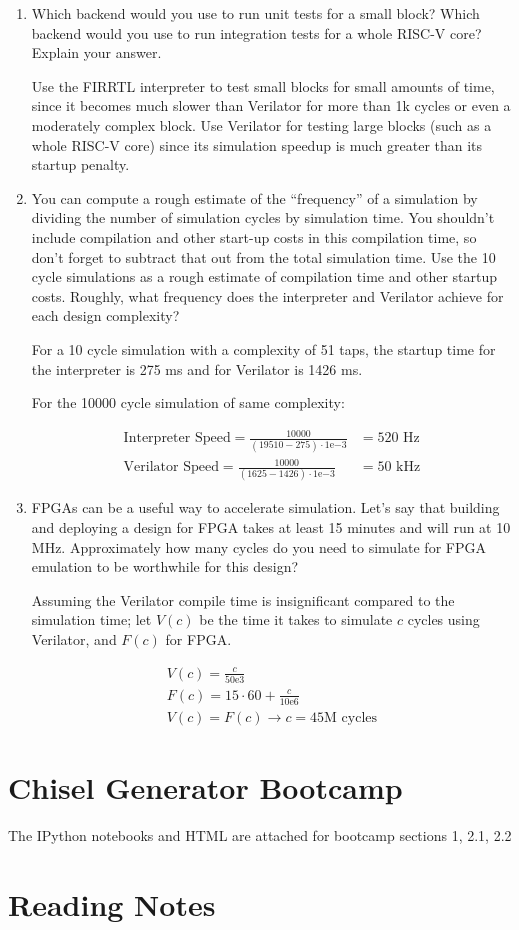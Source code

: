 \begin{enumerate}
\item {\color{blue} Which backend would you use to run unit tests for a small block? Which backend would you use to run integration tests for a whole RISC-V core? Explain your answer.}

Use the FIRRTL interpreter to test small blocks for small amounts of time, since it becomes much slower than Verilator for more than 1k cycles or even a moderately complex block. Use Verilator for testing large blocks (such as a whole RISC-V core) since its simulation speedup is much greater than its startup penalty.

\item {\color{blue} You can compute a rough estimate of the “frequency” of a simulation by dividing the number of simulation cycles by simulation time. You shouldn’t include compilation and other start-up costs in this compilation time, so don’t forget to subtract that out from the total simulation time. Use the 10 cycle simulations as a rough estimate of compilation time and other startup costs. Roughly, what frequency does the interpreter and Verilator achieve for each design complexity?}

For a 10 cycle simulation with a complexity of 51 taps, the startup time for the interpreter is 275 ms and for Verilator is 1426 ms.

For the 10000 cycle simulation of same complexity:

\begin{align}
    \text{Interpreter Speed} = \frac{10000}{(19510 - 275) \cdot 1\mathrm{e}{-3}} &= 520 \text{ Hz} \nonumber \\
    \text{Verilator Speed} = \frac{10000}{(1625 - 1426) \cdot 1\mathrm{e}{-3}} &= 50 \text{ kHz} \nonumber
\end{align}

\item {\color{blue} FPGAs can be a useful way to accelerate simulation. Let’s say that building and deploying a design for FPGA takes at least 15 minutes and will run at 10 MHz. Approximately how many cycles do you need to simulate for FPGA emulation to be worthwhile for this design?}

Assuming the Verilator compile time is insignificant compared to the simulation time; let $V(c)$ be the time it takes to simulate $c$ cycles using Verilator, and $F(c)$ for FPGA.

\begin{align}
    V(c) = \frac{c}{50\mathrm{e}{3}} \nonumber \\
    F(c) = 15 \cdot 60 + \frac{c}{10\mathrm{e}{6}} \nonumber \\
    V(c) = F(c) \rightarrow c = 45 \text{M cycles} \nonumber
\end{align}
\end{enumerate}

\section{Chisel Generator Bootcamp}
The IPython notebooks and HTML are attached for bootcamp sections 1, 2.1, 2.2

\section{Reading Notes}



